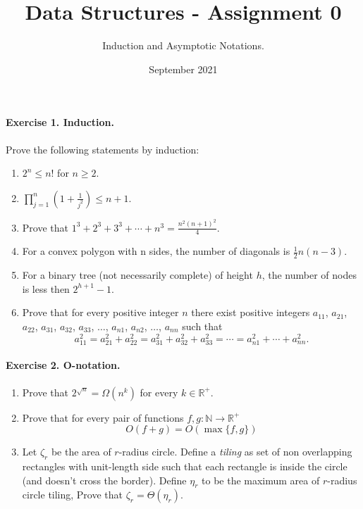 \title{Data Structures - Assignment 0} 
\author{Induction and Asymptotic Notations.}
\date{September 2021}



\paragraph{Exercise 1. Induction.}Prove the following statements by induction:
\begin{enumerate}
    \item \( 2^n \le n!\) for \(n\ge 2\).
    \item \(\prod^{n}_{j=1}{\left(1 +\frac{1}{j^2}\right)} \le n+1\).
    \item Prove that \( \displaystyle 1^3+2^3+3^3+\cdots+ n^3=\frac{n^2(n+1)^2}4 \).
    \item For a convex polygon with n sides, the number of diagonals is \(\frac{1}{2}n\left(n-3\right)\).
    \item For a binary tree (not necessarily complete) of height \(h\), the number of nodes is less then \(2^{h+1} -1 \).
    \item Prove that for every positive integer \( n \) there exist positive integers \( a_{11} \),  \( a_{21} \), \( a_{22} \), \( a_{31} \), \( a_{32} \), \( a_{33} \), \( \dots \), \( a_{n1} \), \( a_{n2} \), \( \dots \), \( a_{nn} \) such that 
\[ a_{11}^2=a_{21}^2+a_{22}^2=a_{31}^2+a_{32}^2+a_{33}^2=\cdots=a_{n1}^2+\cdots+a_{nn}^2.\]
\end{enumerate}


\paragraph{Exercise 2. O-notation.}
\begin{enumerate}
\item Prove that \(2^{\sqrt{n}} = \Omega\left(n^k\right)\) for every \(k \in \mathbb{R}^{+}\). 
\item Prove that for every pair of functions \(f,g : \mathbb{N} \rightarrow \mathbb{R}^{+}\) \begin{equation*}
     O \left( f + g \right) = O \left( \max{\{f,g\}} \right)
\end{equation*} 


\item Let \(\zeta_r\) be the area of \(r\)-radius circle. Define a \textit{tiling} as set of non overlapping rectangles with unit-length side such that each rectangle is inside the circle (and doesn't cross the border). Define \(\eta_r\) to be the maximum area of \(r\)-radius circle tiling, Prove that \( \zeta_r = \Theta\left(\eta_r\right)\).  
\end{enumerate}

